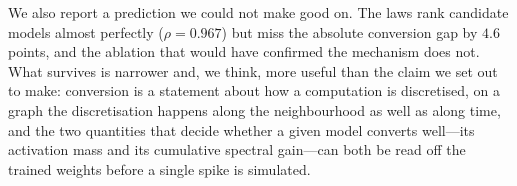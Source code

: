 \documentclass[10pt,twocolumn]{article}
\begin{document}
We also report a prediction we could not make good on. The laws rank candidate models almost
perfectly ($\rho=0.967$) but miss the absolute conversion gap by $4.6$ points, and the ablation that
would have confirmed the mechanism does not. What survives is narrower and, we think, more useful
than the claim we set out to make: conversion is a statement about how a computation is discretised,
on a graph the discretisation happens along the neighbourhood as well as along time, and the two
quantities that decide whether a given model converts well---its activation mass and its cumulative
spectral gain---can both be read off the trained weights before a single spike is simulated.



\end{document}
